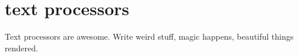 \chapter{text processors}
Text processors are awesome. Write weird stuff, magic happens, beautiful things rendered.


